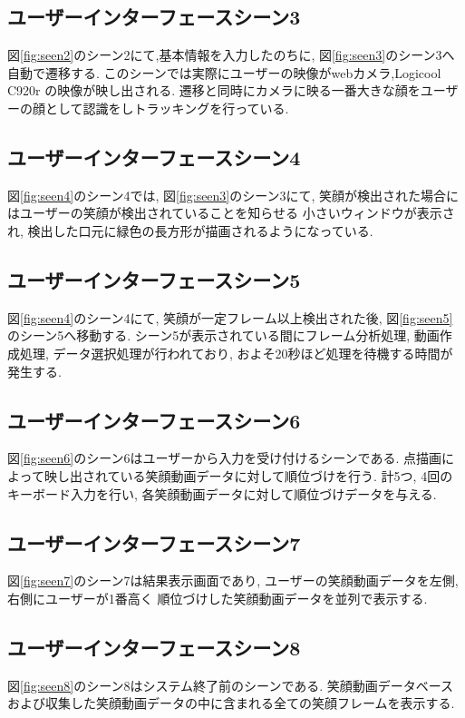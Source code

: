 \subsection{ユーザーインターフェースシーン3}
図\ref{fig:seen2}のシーン2にて,基本情報を入力したのちに, 図\ref{fig:seen3}のシーン3へ自動で遷移する.
このシーンでは実際にユーザーの映像がwebカメラ,Logicool C920r の映像が映し出される.
遷移と同時にカメラに映る一番大きな顔をユーザーの顔として認識をしトラッキングを行っている.

\subsection{ユーザーインターフェースシーン4}
図\ref{fig:seen4}のシーン4では, 図\ref{fig:seen3}のシーン3にて, 笑顔が検出された場合にはユーザーの笑顔が検出されていることを知らせる
小さいウィンドウが表示され, 検出した口元に緑色の長方形が描画されるようになっている.

\subsection{ユーザーインターフェースシーン5}
図\ref{fig:seen4}のシーン4にて, 笑顔が一定フレーム以上検出された後, 図\ref{fig:seen5} のシーン5へ移動する.
シーン5が表示されている間にフレーム分析処理, 動画作成処理, データ選択処理が行われており,
およそ20秒ほど処理を待機する時間が発生する.

\subsection{ユーザーインターフェースシーン6}
図\ref{fig:seen6}のシーン6はユーザーから入力を受け付けるシーンである.
点描画によって映し出されている笑顔動画データに対して順位づけを行う.
計5つ, 4回のキーボード入力を行い, 各笑顔動画データに対して順位づけデータを与える.

\subsection{ユーザーインターフェースシーン7}
図\ref{fig:seen7}のシーン7は結果表示画面であり, ユーザーの笑顔動画データを左側, 右側にユーザーが1番高く
順位づけした笑顔動画データを並列で表示する.

\subsection{ユーザーインターフェースシーン8}
図\ref{fig:seen8}のシーン8はシステム終了前のシーンである.
笑顔動画データベースおよび収集した笑顔動画データの中に含まれる全ての笑顔フレームを表示する.

